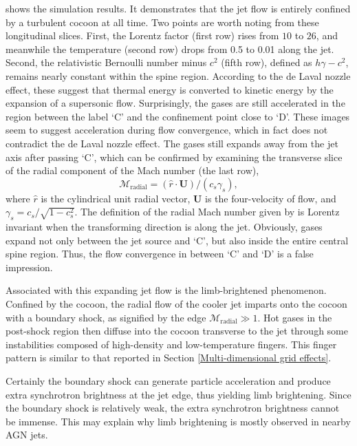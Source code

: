 \documentclass[twocolumn]{aastex63}
\begin{document}
 shows the simulation results. It demonstrates that the jet flow is entirely confined by a turbulent cocoon at all time. Two points are worth noting from these longitudinal slices. First, the Lorentz factor (first row) rises from $10$ to $26$, and meanwhile the temperature (second row) drops from 0.5 to 0.01 along the jet. Second, the relativistic Bernoulli number minus $c^2$ (fifth row), defined as $h\gamma-c^2$, remains nearly constant within the spine region. According to the de Laval nozzle effect, these suggest that thermal energy is converted to kinetic energy by the expansion of a supersonic flow. Surprisingly, the gases are still accelerated in the region between the label `C' and the confinement point close to `D'. These images seem to suggest acceleration during flow convergence, which in fact does not contradict the de Laval nozzle effect. The gases still expands away from the jet axis after passing `C', which can be confirmed by examining the transverse slice of the radial component of the Mach number (the last row),
\begin{equation}
     \mathscr{M}_{\text{radial}}=\left(\hat{r}\cdot \mathbf{U}\right)/\left(c_{s}\gamma_{s}\right),
     \label{eq:transverse Mach number}
 \end{equation}
where $\hat{r}$ is the cylindrical unit radial vector, $\mathbf{U}$ is the four-velocity of flow, and $\gamma_{s}=c_{s}/\sqrt{1-c_{s}^2}$. The definition of the radial Mach number given by  is Lorentz invariant when the transforming direction is along the jet. Obviously, gases expand not only between the jet source and `C', but also inside the entire central spine region. Thus, the flow convergence in between `C' and `D' is a false impression.

Associated with this expanding jet flow is the limb-brightened phenomenon. Confined by the cocoon, the radial flow of the cooler jet imparts onto the cocoon with a boundary shock, as signified by the edge $\mathscr{M}_{\text{radial}} \gg 1$. Hot gases in the post-shock region then diffuse into the cocoon transverse to the jet through some instabilities composed of high-density and low-temperature fingers. This finger pattern is similar to that reported in Section \ref{Multi-dimensional grid effects}.

Certainly the boundary shock can generate particle acceleration and produce extra synchrotron brightness at the jet edge, thus yielding limb brightening. Since the boundary shock is relatively weak, the extra synchrotron brightness cannot be immense. This may explain why limb brightening is mostly observed in nearby AGN jets.
\end{document}
